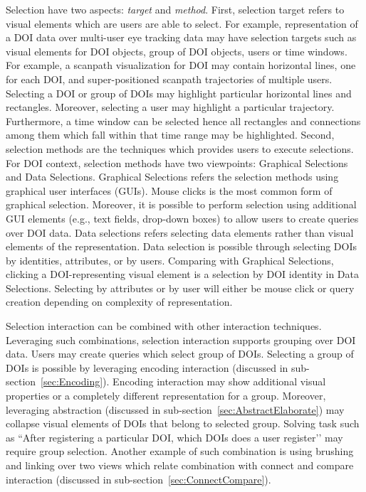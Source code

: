 Selection have two aspects: \textit{target} and \textit{method}. First, selection target refers to visual elements which are users are able to select. For example, representation of a DOI data over multi-user eye tracking data may have selection targets such as visual elements for DOI objects, group of DOI objects, users or time windows. For example, a scanpath visualization for DOI may contain horizontal lines, one for each DOI, and super-positioned scanpath trajectories of multiple users. Selecting a DOI or group of DOIs may highlight particular horizontal lines and rectangles. Moreover, selecting a user may highlight a particular trajectory. Furthermore, a time window can be selected hence all rectangles and connections among them which fall within that time range may be highlighted. Second, selection methods are the techniques which provides users to execute selections. For DOI context, selection methods have two viewpoints: Graphical Selections and Data Selections. Graphical Selections refers the selection methods using graphical user interfaces (GUIs). Mouse clicks is the most common form of graphical selection. Moreover, it is possible to perform selection using additional GUI elements (e.g., text fields, drop-down boxes) to allow users to create queries over DOI data. Data selections refers selecting data elements rather than visual elements of the representation. Data selection is possible through selecting DOIs by identities, attributes, or by users.  Comparing with Graphical Selections, clicking a DOI-representing visual element is a selection by DOI identity in Data Selections. Selecting by attributes or by user will either be mouse click or query creation depending on complexity of representation.
 
Selection interaction can be combined with other interaction techniques. Leveraging such combinations, selection interaction supports grouping over DOI data. Users may create queries which select group of DOIs. Selecting a group of DOIs is possible by leveraging encoding interaction (discussed in sub-section~\ref{sec:Encoding}). Encoding interaction may show additional visual properties or a completely different representation for a group. Moreover, leveraging abstraction (discussed in sub-section~\ref{sec:AbstractElaborate}) may collapse visual elements of DOIs that belong to selected group. Solving task such as ``After registering a particular DOI, which DOIs does a user register’’ may require group selection. Another example of such combination is using brushing and linking over two views which relate combination with connect and compare interaction (discussed in sub-section~\ref{sec:ConnectCompare}). 
	
